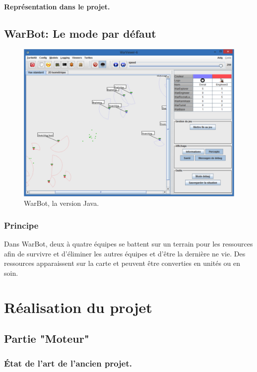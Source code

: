 \documentclass{report}
\begin{document}
\subsection{Représentation dans le projet.}

\newpage

\chapter{WarBot: Le mode par défaut}
\begin{figure}[h]
\centering
\includegraphics[scale=0.7]{interface-warbot3}
\caption{WarBot, la version Java.}
\end{figure}

\section{Principe}
Dans WarBot, deux à quatre équipes se battent sur un terrain pour les ressources afin de survivre et d'éliminer les autres équipes et d’être la dernière ne vie. Des ressources apparaissent sur la carte et peuvent être converties en unités ou en soin.

\newpage
\part{Réalisation du projet}
\newpage

\chapter{Partie "Moteur"}

\section{État de l'art de l'ancien projet.}
\end{document}
